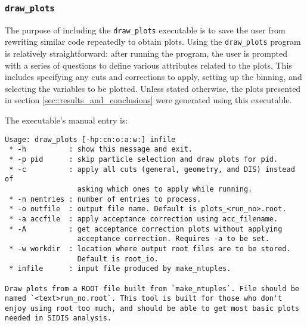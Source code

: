 \subsubsection{\texttt{draw\_plots}}
\label{sssec::draw_plots}
    The purpose of including the \texttt{draw\_plots} executable is to save the user from rewriting similar code repeatedly to obtain plots.
    Using the \texttt{draw\_plots} program is relatively straightforward: after running the program, the user is prompted with a series of questions to define various attributes related to the plots.
    This includes specifying any cuts and corrections to apply, setting up the binning, and selecting the variables to be plotted.
    Unless stated otherwise, the plots presented in section \ref{sec::results_and_conclusions} were generated using this executable.

    The executable's manual entry is:
    \begin{lstlisting}
Usage: draw_plots [-hp:cn:o:a:w:] infile
 * -h          : show this message and exit.
 * -p pid      : skip particle selection and draw plots for pid.
 * -c          : apply all cuts (general, geometry, and DIS) instead of
                 asking which ones to apply while running.
 * -n nentries : number of entries to process.
 * -o outfile  : output file name. Default is plots_<run_no>.root.
 * -a accfile  : apply acceptance correction using acc_filename.
 * -A          : get acceptance correction plots without applying
                 acceptance correction. Requires -a to be set.
 * -w workdir  : location where output root files are to be stored.
                 Default is root_io.
 * infile      : input file produced by make_ntuples.

Draw plots from a ROOT file built from `make_ntuples`. File should be named `<text>run_no.root`. This tool is built for those who don't enjoy using root too much, and should be able to get most basic plots needed in SIDIS analysis.
    \end{lstlisting}

